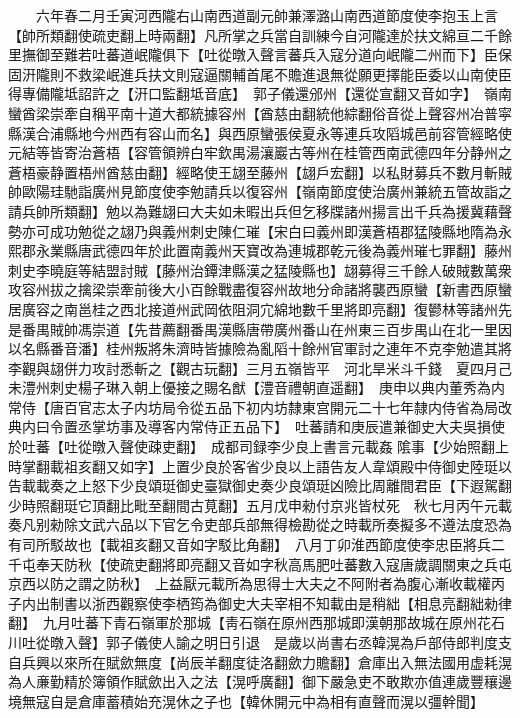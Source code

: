 　　六年春二月壬寅河西隴右山南西道副元帥兼澤潞山南西道節度使李抱玉上言【帥所類翻使疏吏翻上時兩翻】凡所掌之兵當自訓練今自河隴達於扶文綿亘二千餘里撫御至難若吐蕃道岷隴俱下【吐從暾入聲言蕃兵入寇分道向岷隴二州而下】臣保固汧隴則不救梁岷進兵扶文則寇逼關輔首尾不贍進退無從願更擇能臣委以山南使臣得專備隴坻詔許之【汧口監翻坻音底】　郭子儀還邠州【還從宣翻又音如字】　嶺南蠻酋梁崇牽自稱平南十道大都統據容州【酋慈由翻統他綜翻俗音從上聲容州冶普寜縣漢合浦縣地今州西有容山而名】與西原蠻張侯夏永等連兵攻䧟城邑前容管經略使元結等皆寄治蒼梧【容管領辨白牢欽禺湯瀼巖古等州在桂管西南武德四年分静州之蒼梧豪静置梧州酋慈由翻】經略使王翃至藤州【翃戶宏翻】以私財募兵不數月斬賊帥歐陽珪馳詣廣州見節度使李勉請兵以復容州【嶺南節度使治廣州兼統五管故詣之請兵帥所類翻】勉以為難翃曰大夫如未暇出兵但乞移牒諸州揚言出千兵為援冀藉聲勢亦可成功勉從之翃乃與義州刺史陳仁璀【宋白曰義州即漢蒼梧郡猛陵縣地隋為永熙郡永業縣唐武德四年於此置南義州天寶改為連城郡乾元後為義州璀七罪翻】藤州刺史李曉庭等結盟討賊【藤州治鐔津縣漢之猛陵縣也】翃募得三千餘人破賊數萬衆攻容州拔之擒梁崇牽前後大小百餘戰盡復容州故地分命諸將襲西原蠻【新書西原蠻居廣容之南邕桂之西北接道州武岡依阻洞宂綿地數千里將即亮翻】復鬰林等諸州先是番禺賊帥馮崇道【先昔薦翻番禺漢縣唐帶廣州番山在州東三百步禺山在北一里因以名縣番音潘】桂州叛將朱濟時皆據險為亂䧟十餘州官軍討之連年不克李勉遣其將李觀與翃併力攻討悉斬之【觀古玩翻】三月五嶺皆平　河北旱米斗千錢　夏四月己未澧州刺史楊子琳入朝上優接之賜名猷【澧音禮朝直遥翻】　庚申以典内董秀為内常侍【唐百官志太子内坊局令從五品下初内坊隸東宫開元二十七年隸内侍省為局改典内曰令置丞掌坊事及導客内常侍正五品下】　吐蕃請和庚辰遣兼御史大夫吳損使於吐蕃【吐從暾入聲使疎吏翻】　成都司録李少良上書言元載姦隂事【少始照翻上時掌翻載祖亥翻又如字】上置少良於客省少良以上語告友人韋頌殿中侍御史陸珽以告載載奏之上怒下少良頌珽御史臺獄御史奏少良頌珽凶險比周離間君臣【下遐駕翻少時照翻珽它頂翻比毗至翻間古莧翻】五月戊申勑付京兆皆杖死　秋七月丙午元載奏凡别勑除文武六品以下官乞令吏部兵部無得檢勘從之時載所奏擬多不遵法度恐為有司所駁故也【載祖亥翻又音如字駁比角翻】　八月丁卯淮西節度使李忠臣將兵二千屯奉天防秋【使疏吏翻將即亮翻又音如字秋高馬肥吐蕃數入寇唐歲調關東之兵屯京西以防之謂之防秋】　上益厭元載所為思得士大夫之不阿附者為腹心漸收載權丙子内出制書以浙西觀察使李栖筠為御史大夫宰相不知載由是稍絀【相息亮翻絀勑律翻】　九月吐蕃下青石嶺軍於那城【靑石嶺在原州西那城即漢朝那故城在原州花石川吐從暾入聲】郭子儀使人諭之明日引退　是歲以尚書右丞韓滉為戶部侍郎判度支自兵興以來所在賦歛無度【尚辰羊翻度徒洛翻歛力贍翻】倉庫出入無法國用虚耗滉為人亷勤精於簿領作賦歛出入之法【滉呼廣翻】御下嚴急吏不敢欺亦值連歲豐穰邊境無寇自是倉庫蓄積始充滉休之子也【韓休開元中為相有直聲而滉以彊幹聞】

